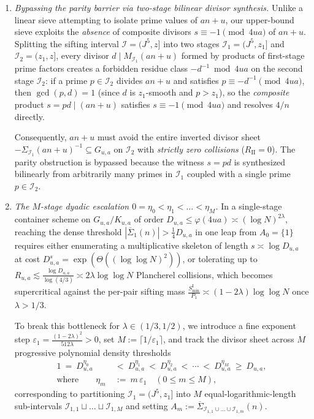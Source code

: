 \documentclass[11pt, a4paper]{article}
\theoremstyle{plain}
\theoremstyle{definition}
\begin{document}
\begin{enumerate}[label=\arabic*.]
    \item \emph{Bypassing the parity barrier via two-stage bilinear divisor synthesis.} 
    Unlike a linear sieve attempting to isolate prime values of $an+u$, our upper-bound sieve exploits the \emph{absence} of composite divisors $s\equiv-1\pmod{4ua}$ of $an+u$. Splitting the sifting interval $\mathcal{I}=(J^{5},z]$ into two stages $\mathcal{I}_1=(J^{5},z_1]$ and $\mathcal{I}_2=(z_1,z]$, every divisor $d\mid M_{\mathcal{I}_1}(an+u)$ formed by products of first-stage prime factors creates a forbidden residue class $-d^{-1}\bmod 4ua$ on the second stage $\mathcal{I}_2$: if a prime $p\in\mathcal{I}_2$ divides $an+u$ and satisfies $p\equiv-d^{-1}\pmod{4ua}$, then $\gcd(p,d)=1$ (since $d$ is $z_1$-smooth and $p>z_1$), so the \emph{composite} product $s=pd\mid(an+u)$ satisfies $s\equiv-1\pmod{4ua}$ and resolves $4/n$ directly. 
    
    Consequently, $an+u$ must avoid the entire inverted divisor sheet $-\Sigma_{\mathcal{I}_1}(an+u)^{-1}\subseteq G_{u,a}$ on $\mathcal{I}_2$ with \emph{strictly zero collisions} ($R_{\mathrm{II}}=0$). The parity obstruction is bypassed because the witness $s=pd$ is synthesized bilinearly from arbitrarily many primes in $\mathcal{I}_1$ coupled with a single prime $p\in\mathcal{I}_2$.

    \item \emph{The $M$-stage dyadic escalation $0=\eta_0<\eta_1<\dots<\eta_M$.} 
    In a single-stage container scheme on $G_{u,a}/K_{u,a}$ of order $D_{u,a}\le\varphi(4ua)\asymp(\log N)^{2\lambda}$, reaching the dense threshold $|\overline{\Sigma}_1(n)|>\frac14 D_{u,a}$ in one leap from $A_0=\{1\}$ requires either enumerating a multiplicative skeleton of length $s\asymp\log D_{u,a}$ at cost $D_{u,a}^{s}=\exp(\Theta((\log\log N)^{2}))$, or tolerating up to $R_{u,a}\lesssim\frac{\log D_{u,a}}{\log(4/3)}\asymp 2\lambda\log\log N$ Plancherel collisions, which becomes supercritical against the per-pair sifting mass $\frac{S_{\min}^{\mathrm{I}}}{P_1}\asymp(1-2\lambda)\log\log N$ once $\lambda>1/3$. 
    
    To break this bottleneck for $\lambda\in(1/3,1/2)$, we introduce a fine exponent step $\varepsilon_1=\frac{(1-2\lambda)^{2}}{512\lambda}>0$, set $M:=\lceil 1/\varepsilon_1\rceil$, and track the divisor sheet across $M$ progressive polynomial density thresholds
    \[
    \begin{aligned}
    1\ =\ D_{u,a}^{\eta_0}\ &<\ D_{u,a}^{\eta_1}\ <\ D_{u,a}^{\eta_2}\ <\ \cdots\ <\ D_{u,a}^{\eta_M}\ \ge\ D_{u,a},\\
    \text{where}\qquad\eta_m\ &:=\ m\,\varepsilon_1\quad(0\le m\le M),
    \end{aligned}
    \]
    corresponding to partitioning $\mathcal{I}_1=(J^{5},z_1]$ into $M$ equal-logarithmic-length sub-intervals $\mathcal{I}_{1,1}\sqcup\dots\sqcup\mathcal{I}_{1,M}$ and setting $A_m:=\overline{\Sigma}_{\mathcal{I}_{1,1}\cup\dots\cup\mathcal{I}_{1,m}}(n)$. 
    

\end{enumerate}
\end{document}
